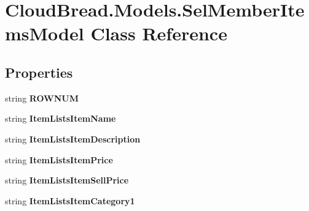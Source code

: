 \hypertarget{a00101}{}\section{Cloud\+Bread.\+Models.\+Sel\+Member\+Items\+Model Class Reference}
\label{a00101}
\subsection*{Properties}
\begin{DoxyCompactItemize}
\item 
string {\bfseries R\+O\+W\+N\+UM}\hypertarget{a00101_a49621acf055ba630928143f9a9076937}{}\label{a00101_a49621acf055ba630928143f9a9076937}

\item 
string {\bfseries Item\+Lists\+Item\+Name}\hypertarget{a00101_a1dda251f6b537284afa1efbcc871828c}{}\label{a00101_a1dda251f6b537284afa1efbcc871828c}

\item 
string {\bfseries Item\+Lists\+Item\+Description}\hypertarget{a00101_acd2139fb6822551bf9e2ca2e2a984863}{}\label{a00101_acd2139fb6822551bf9e2ca2e2a984863}

\item 
string {\bfseries Item\+Lists\+Item\+Price}\hypertarget{a00101_ad3e68d15728de110b8bb3fc3632bef1f}{}\label{a00101_ad3e68d15728de110b8bb3fc3632bef1f}

\item 
string {\bfseries Item\+Lists\+Item\+Sell\+Price}\hypertarget{a00101_a992f582d0bc91452110042e36796240b}{}\label{a00101_a992f582d0bc91452110042e36796240b}

\item 
string {\bfseries Item\+Lists\+Item\+Category1}\hypertarget{a00101_a6dbed0bcdb88f9d03219c413ea45357b}{}\label{a00101_a6dbed0bcdb88f9d03219c413ea45357b}


\end{DoxyCompactItemize}
